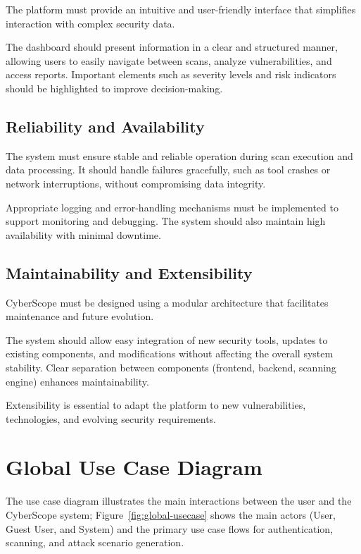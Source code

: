 \indent The platform must provide an intuitive and user-friendly interface that simplifies interaction with complex security data.

\indent The dashboard should present information in a clear and structured manner, allowing users to easily navigate between scans, analyze vulnerabilities, and access reports. Important elements such as severity levels and risk indicators should be highlighted to improve decision-making.

\subsection{Reliability and Availability}

\indent The system must ensure stable and reliable operation during scan execution and data processing. It should handle failures gracefully, such as tool crashes or network interruptions, without compromising data integrity.

\indent Appropriate logging and error-handling mechanisms must be implemented to support monitoring and debugging. The system should also maintain high availability with minimal downtime.

\subsection{Maintainability and Extensibility}

\indent CyberScope must be designed using a modular architecture that facilitates maintenance and future evolution.

\indent The system should allow easy integration of new security tools, updates to existing components, and modifications without affecting the overall system stability. Clear separation between components (frontend, backend, scanning engine) enhances maintainability.

\indent Extensibility is essential to adapt the platform to new vulnerabilities, technologies, and evolving security requirements.

\section{Global Use Case Diagram}

\indent The use case diagram illustrates the main interactions between the user and the CyberScope system; Figure~\ref{fig:global-usecase} shows the main actors (User, Guest User, and System) and the primary use case flows for authentication, scanning, and attack scenario generation.

